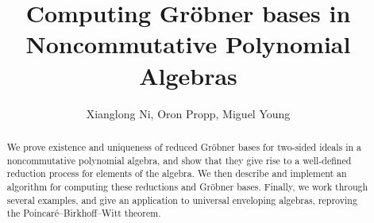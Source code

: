 \documentclass[10pt,a4paper]{amsart}
\begin{document}
	\title{Computing Gr\"obner bases in Noncommutative Polynomial Algebras}
	\author{Xianglong Ni, Oron Propp, Miguel Young }
	
	\maketitle
	
    \begin{abstract}
    We prove existence and uniqueness of reduced Gr\"obner bases for two-sided ideals in a noncommutative polynomial algebra, and show that they give rise to a well-defined reduction process for elements of the algebra. We then describe and implement an algorithm for computing these reductions and Gr\"obner bases. Finally, we work through several examples, and give an application to universal enveloping algebras, reproving the Poincar\'e--Birkhoff--Witt theorem.
    \end{abstract}

	\tableofcontents

    
    
    
    
    
    

    
	
\end{document}
